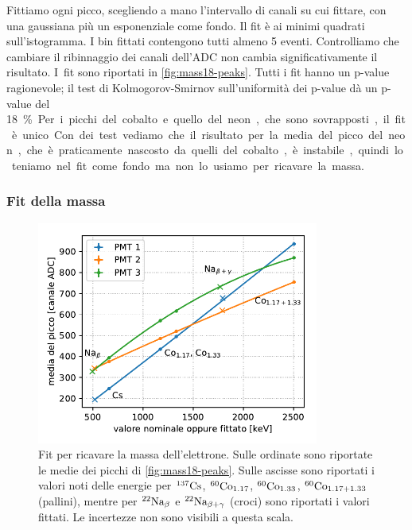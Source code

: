 Fittiamo ogni picco, scegliendo a mano l'intervallo di canali su cui fittare,
con una gaussiana più un esponenziale come fondo.
Il fit è ai minimi quadrati sull'istogramma.
I bin fittati contengono tutti almeno 5 eventi.
Controlliamo che cambiare il ribinnaggio dei canali dell'ADC non cambia significativamente il risultato.
I~fit sono riportati in \autoref{fig:mass18-peaks}.
Tutti i fit hanno un p-value ragionevole;
il test di Kolmogorov-Smirnov sull'uniformità dei p-value dà un p-value del \SI{18}\%.
Per i picchi del cobalto e quello del neon, che sono sovrapposti, il fit è unico.
Con dei test vediamo che il risultato per la media del picco del neon,
che è praticamente nascosto da quelli del cobalto,
è instabile, quindi lo teniamo nel fit come fondo ma non lo usiamo per ricavare la massa.

\subsubsection{Fit della massa}

\begin{figure}
	\centering
	\includegraphics[width=25em]{immagini/mass18-cal}
	\caption{\label{fig:mass18-cal}
	Fit per ricavare la massa dell'elettrone.
	Sulle ordinate sono riportate le medie dei picchi di \autoref{fig:mass18-peaks}.
	Sulle ascisse sono riportati i valori noti delle energie
	per $^{\text{137}}\text{Cs}$, $^{\text{60}}\text{Co}_{1.17}$, $^{\text{60}}\text{Co}_{1.33}$, $^{\text{60}}\text{Co}_{1.17+1.33}$ (pallini),
	mentre per $^{\text{22}}\text{Na}_\beta$ e $^{\text{22}}\text{Na}_{\beta+\gamma}$ (croci) sono riportati i valori fittati.
	Le incertezze non sono visibili a questa scala.}
\end{figure}

